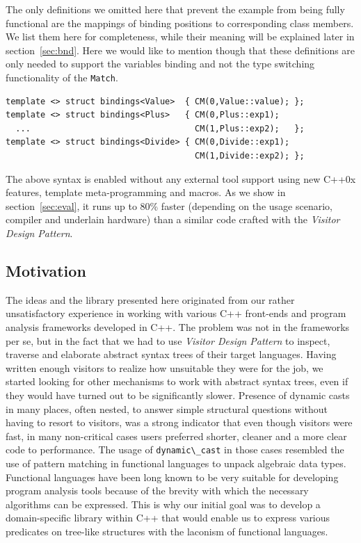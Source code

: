 \documentclass[preprint]{sigplanconf}
\makeatletter
\DeclareRobustCommand{\code}[1]{{\lstinline[breaklines=false,escapechar=@]{#1}}}
\makeatother
\begin{document}
The only definitions we omitted here that prevent the example from being fully 
functional are the mappings of binding positions to corresponding class members. 
We list them here for completeness, while their meaning will be explained later 
in section~\ref{sec:bnd}. Here we would like to mention though that these 
definitions are only needed to support the variables binding and not the type 
switching functionality of the \code{Match}.

\begin{lstlisting}[keepspaces,columns=flexible]
template <> struct bindings<Value>  { CM(0,Value::value); };
template <> struct bindings<Plus>   { CM(0,Plus::exp1); 
  ...                                 CM(1,Plus::exp2);   };
template <> struct bindings<Divide> { CM(0,Divide::exp1); 
                                      CM(1,Divide::exp2); };
\end{lstlisting}

The above syntax is enabled without any external tool support using new C++0x 
features\cite{C++0x}, template meta-programming and macros. As we 
show in section~\ref{sec:eval}, it runs up to 80\% faster (depending on the usage 
scenario, compiler and underlain hardware) than a similar code crafted with the 
\emph{Visitor Design Pattern}.

\subsection{Motivation}


The ideas and the library presented here originated from our rather 
unsatisfactory experience in working with various C++ front-ends and program 
analysis frameworks developed in C++\cite{Pivot09,Phoenix,Clang,Lise}. The 
problem was not in the frameworks per se, but in the fact that we had to use 
\emph{Visitor Design Pattern}\cite{DesignPatterns1993} to inspect, traverse and 
elaborate abstract syntax trees of their target languages. Having written enough 
visitors to realize how unsuitable they were for the job, we started looking for 
other mechanisms to work with abstract syntax trees, even if they would have 
turned out to be significantly slower. 
Presence of dynamic casts in many places, often nested, to answer simple 
structural questions without having to resort to visitors, was a strong 
indicator that even though visitors were fast, in many non-critical cases 
users preferred shorter, cleaner and a more clear code to performance.
The usage of \code{dynamic\_cast} in those cases resembled the use of 
pattern matching in functional languages to unpack algebraic data types. 
Functional languages have been long known to be very suitable for developing 
program analysis tools because of the brevity with which the necessary 
algorithms can be expressed. This is why our initial goal was to develop a 
domain-specific library within C++ that would enable us to express various 
predicates on tree-like structures with the laconism of functional languages.
\end{document}

